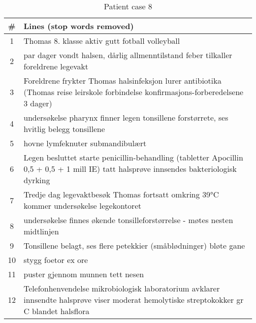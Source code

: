 \begin{table}[htbp] \footnotesize \center
\caption{Patient case 8\label{tab:pcase8}}
\begin{tabularx}{\textwidth}{c X}
    \toprule
    \# & Lines (stop words removed) \\
    \midrule
	1 & Thomas 8. klasse aktiv gutt fotball volleyball \\
	2 & par dager vondt halsen, dårlig allmenntilstand feber tilkaller foreldrene legevakt \\
	3 & Foreldrene frykter Thomas halsinfeksjon lurer antibiotika (Thomas reise leirskole forbindelse konfirmasjons-forberedelsene 3 dager) \\
	4 & undersøkelse pharynx finner legen tonsillene forstørrete, ses hvitlig belegg tonsillene \\
	5 & hovne lymfeknuter submandibulært \\
	6 & Legen besluttet starte penicillin-behandling (tabletter Apocillin 0,5 + 0,5 + 1 mill IE) tatt halsprøve innsendes bakteriologisk dyrking \\
	7 & Tredje dag legevaktbesøk Thomas fortsatt omkring 39°C kommer undersøkelse legekontoret \\
	8 & undersøkelse finnes økende tonsilleforstørrelse - møtes nesten midtlinjen \\
	9 & Tonsillene belagt, ses flere petekkier (småblødninger) bløte gane \\
	10 & stygg foetor ex ore \\
	11 & puster gjennom munnen tett nesen \\
	12 & Telefonhenvendelse mikrobiologisk laboratorium avklarer innsendte halsprøve viser moderat hemolytiske streptokokker gr C blandet halsflora \\
	\bottomrule
\end{tabularx}
\end{table}


